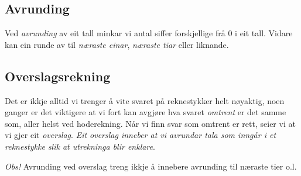 \subsection{Avrunding}
Ved \textit{avrunding} av  eit  tall minkar vi antal siffer forskjellige frå 0 i eit  tall. Vidare kan ein runde av til \textsl{næraste einar}, \textsl{næraste tiar} eller liknande.\regv
{}


\subsection{Overslagsrekning}
Det er ikkje alltid vi trenger å vite svaret på reknestykker helt nøyaktig, noen ganger er det viktigere at vi fort kan avgjøre hva svaret \textsl{omtrent} er det samme som, aller helst ved hoderekning. Når vi finn svar som omtrent er rett, seier vi at vi gjer eit \textit{overslag}. \textsl{Eit overslag inneber at vi avrundar tala som inngår i et reknestykke slik at utrekninga blir enklare}. \vsk

\textit{Obs!} Avrunding ved overslag treng ikkje å innebere avrunding til næraste tier o.l.\vsk

